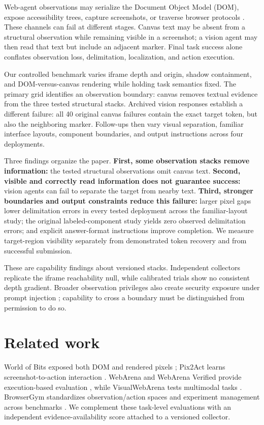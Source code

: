 \documentclass{article}
\begin{document}
Web-agent observations may serialize the Document Object Model (DOM), expose accessibility trees, capture screenshots, or traverse browser protocols \citep{deng2023mind2web,zhou2024webarena,he2024webvoyager}. These channels can fail at different stages. Canvas text may be absent from a structural observation while remaining visible in a screenshot; a vision agent may then read that text but include an adjacent marker. Final task success alone conflates observation loss, delimitation, localization, and action execution.

Our controlled benchmark varies iframe depth and origin, shadow containment, and DOM-versus-canvas rendering while holding task semantics fixed. The primary grid identifies an observation boundary: canvas removes textual evidence from the three tested structural stacks. Archived vision responses establish a different failure: all 40 original canvas failures contain the exact target token, but also the neighboring marker. Follow-ups then vary visual separation, familiar interface layouts, component boundaries, and output instructions across four deployments.

Three findings organize the paper. \textbf{First, some observation stacks remove information:} the tested structural observations omit canvas text. \textbf{Second, visible and correctly read information does not guarantee success:} vision agents can fail to separate the target from nearby text. \textbf{Third, stronger boundaries and output constraints reduce this failure:} larger pixel gaps lower delimitation errors in every tested deployment across the familiar-layout study; the original labeled-component study yields zero observed delimitation errors; and explicit answer-format instructions improve completion. We measure target-region visibility separately from demonstrated token recovery and from successful submission.

These are capability findings about versioned stacks. Independent collectors replicate the iframe reachability null, while calibrated trials show no consistent depth gradient. Broader observation privileges also create security exposure under prompt injection \citep{roesner2026agentic}; capability to cross a boundary must be distinguished from permission to do so.

\section{Related work}

World of Bits exposed both DOM and rendered pixels \citep{shi2017worldofbits}; Pix2Act learns screenshot-to-action interaction \citep{shaw2023pix2act}. WebArena and WebArena Verified provide execution-based evaluation \citep{zhou2024webarena,elhattami2025verified}, while VisualWebArena tests multimodal tasks \citep{koh2024visualwebarena}. BrowserGym standardizes observation/action spaces and experiment management across benchmarks \citep{chezelles2025browsergym}. We complement these task-level evaluations with an independent evidence-availability score attached to a versioned collector.
\end{document}
